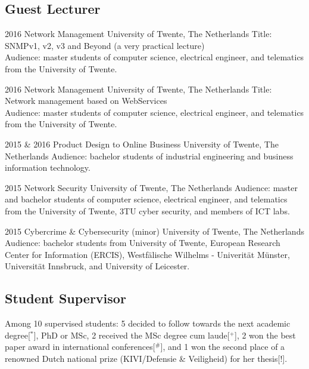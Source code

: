 \documentclass[print]{styles/friggeri-cv-mac} %
\begin{document}
\subsection{Guest Lecturer}\vspace{-5pt}
\begin{entrylist}
\entry
{2016}
{Network Management}
{University of Twente, The Netherlands}
{Title: SNMPv1, v2, v3 and Beyond (a very practical lecture)\\
Audience: master students of computer science, electrical engineer, and telematics from the University of Twente. }

\entry
{2016}
{Network Management}
{University of Twente, The Netherlands}
{Title: Network management based on WebServices\\
Audience: master students of computer science, electrical engineer, and telematics from the University of Twente. }

\entry
{2015 \& 2016}
{Product Design to Online Business}
{University of Twente, The Netherlands}
{Audience: bachelor students of industrial engineering and business information technology.}

\entry
{2015}
{Network Security}
{University of Twente, The Netherlands}
{Audience: master and bachelor students of computer science, electrical engineer, and telematics from the University of Twente, 3TU cyber security, and members of ICT labs. }

\entry
{2015}
{Cybercrime \& Cybersecurity (minor)}
{University of Twente, The Netherlands}
{Audience: bachelor students from University of Twente, European Research Center for Information (ERCIS), Westfälische Wilhelms - Univerität Münster, Universität Innsbruck, and University of Leicester. }
\end{entrylist}

\subsection{Student Supervisor}\vspace{-5pt}
Among 10 supervised students: 5 decided to follow towards the next academic degree[$^*$], PhD or MSc, 2 received the MSc degree cum laude[$^+$], 2 won the best paper award in international conferences[$^\#$], and 1 won the second place of a renowned Dutch national prize (KIVI/Defensie \& Veiligheid) for her thesis[$!$].
\end{document}
